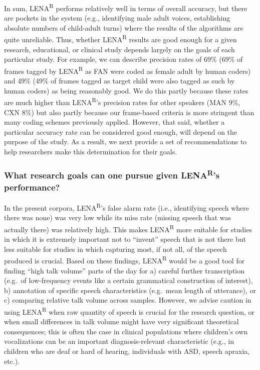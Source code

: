 \documentclass[english,table,man,floatsintext]{apa6}
\begin{document}
In sum, LENA\textsuperscript{R} performs relatively well in terms of overall accuracy, but there are pockets in the system (e.g., identifying male adult voices, establishing absolute numbers of child-adult turns) where the results of the algorithms are quite unreliable. Thus, whether LENA\textsuperscript{R} results are good enough for a given research, educational, or clinical study depends largely on the goals of each particular study. For example, we can describe precision rates of 69\% (69\% of frames tagged by LENA\textsuperscript{R} as FAN were coded as female adult by human coders) and 49\% (49\% of frames tagged as target child were also tagged as such by human coders) as being reasonably good. We do this partly because these rates are much higher than LENA\textsuperscript{R}'s precision rates for other speakers (MAN 9\%, CXN 8\%) but also partly because our frame-based criteria is more stringent than many coding schemes previously applied. However, that said, whether a particular accuracy rate can be considered good enough, will depend on the purpose of the study. As a result, we next provide a set of recommendations to help researchers make this determination for their goals.

\hypertarget{what-research-goals-can-one-pursue-given-lenars-performance}{%
\subsubsection{\texorpdfstring{What research goals can one pursue given LENA\textsuperscript{R}'s performance?}{What research goals can one pursue given LENAR's performance?}}\label{what-research-goals-can-one-pursue-given-lenars-performance}}

In the present corpora, LENA\textsuperscript{R}'s false alarm rate (i.e., identifying speech where there was none) was very low while its miss rate (missing speech that was actually there) was relatively high. This makes LENA\textsuperscript{R} more suitable for studies in which it is extremely important not to \enquote{invent} speech that is not there but less suitable for studies in which capturing most, if not all, of the speech produced is crucial. Based on these findings, LENA\textsuperscript{R} would be a good tool for finding \enquote{high talk volume} parts of the day for a) careful further transcription (e.g.~of low-frequency events like a certain grammatical construction of interest), b) annotation of specific speech characteristics (e.g.~mean length of utterance), or c) comparing relative talk volume across samples. However, we advise caution in using LENA\textsuperscript{R} when raw quantity of speech is crucial for the research question, or when small differences in talk volume might have very significant theoretical consequences; this is often the case in clinical populations where children's own vocalizations can be an important diagnosis-relevant characteristic (e.g., in children who are deaf or hard of hearing, individuals with ASD, speech apraxia, etc.).
\end{document}
